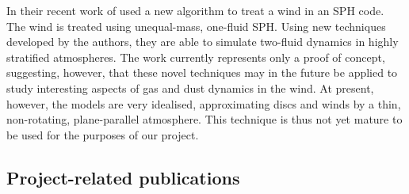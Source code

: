 \documentclass[10pt,fleqn,twoside]{article}
\begin{document}
In their recent work of \citet{2016MNRAS.463.2725H, 
2016MNRAS.461..742H} used a new algorithm to
treat a wind in an SPH code. The wind is treated using unequal-mass, one-fluid SPH. Using new techniques
developed by the authors, they are able to simulate two-fluid dynamics
in highly stratified atmospheres. The work currently represents 
only a proof of concept, suggesting, however, that these novel
techniques may in the future be applied to study interesting aspects of gas and dust
dynamics in the wind. At present, however, the models are very
idealised, approximating discs and winds by a thin, non-rotating,
plane-parallel atmosphere.  This technique is thus not yet mature to
be used for the purposes of our project.


\subsection{Project-related publications}


\end{document}
